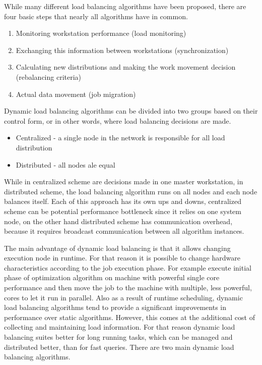 While many different load balancing algorithms have been proposed, there are four basic steps that nearly all algorithms have in common\cite{malik2000dynamic}.
\begin{enumerate}
    \item Monitoring workstation performance (load monitoring)
    \item Exchanging this information between workstations (synchronization)
    \item Calculating new distributions and making the work movement decision (rebalancing criteria)
    \item Actual data movement (job migration)
\end{enumerate}
Dynamic load balancing algorithms can be divided into two groups based on their control form,
or in other words, where load balancing decisions are made\cite{malik2000dynamic}.
\begin{itemize}
    \item Centralized - a single node in the network is responsible for all load distribution
    \item Distributed - all nodes ale equal
\end{itemize}
While in centralized scheme are decisions made in one master workstation,
in distributed scheme, the load balancing algorithm runs on all nodes
and each node balances itself.
Each of this approach has its own ups and downs,
centralized scheme can be potential performance bottleneck
since it relies on one system node,
on the other hand distributed scheme has communication overhead,
because it requires broadcast communication between all algorithm instances.

The main advantage of dynamic load balancing is that it allows changing execution node in runtime.
For that reason it is possible to change hardware characteristics according to the job execution phase.
For example execute initial phase of optimization algorithm on machine with powerful single core performance
and then move the job to the machine with multiple, less powerful, cores to let it run in parallel.
Also as a result of runtime scheduling,
dynamic load balancing algorithms tend to provide a significant improvements in performance over static algorithms.
However, this comes at the additional cost of collecting and maintaining load information\cite{malik2000dynamic}.
For that reason dynamic load balancing suites better for long running tasks, which can be managed and distributed better, than for fast queries.\newline
There are two main dynamic load balancing algorithms.

